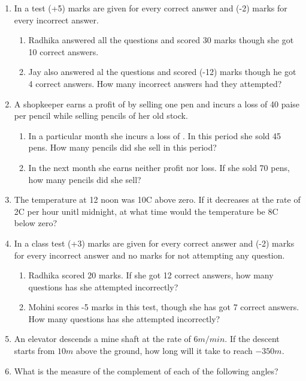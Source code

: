 \begin{enumerate}[label=\thesection.\arabic*, ref=\thesection.\theenumi,resume*]
	\item In a test (+5) marks are given for every correct answer and (-2) marks for every incorrect answer.  
		\begin{enumerate}
			\item Radhika answered all the questions and scored 30 marks though she got 10 correct answers.
			\item Jay also answered al the questions and scored (-12) marks though he got 4 correct answers.  How many incorrect answers had they  attempted?
		\end{enumerate}
	\item A shopkeeper earns a profit of  by selling one pen and incurs a loss of 40 paise per pencil while selling pencils of her old stock.  
		\begin{enumerate}
			\item In a particular month she incurs a loss of .  In this period she sold 45 pens.  How many pencils did she sell in this period?
			\item In the next month she earns neither profit nor loss.  If she sold 70 pens, how many pencils did she sell?
		\end{enumerate}
			\item The temperature at 12 noon was 10\degree C above zero. If it decreases at the rate of 2\degree C per hour unitl midnight, at what time would the temperature be 8\degree C below zero? 
	\item In a class test (+3) marks are given for every correct answer and (-2) marks for every incorrect answer and no marks for not attempting any question.   
		\begin{enumerate}
			\item Radhika scored 20 marks.  If she got 12 correct answers, how many questions has she attempted incorrectly?
			\item Mohini scores -5 marks in this test, though she has got 7 correct answers.   How many questions has she attempted incorrectly?
		\end{enumerate}
	\item An elevator descends a mine shaft at the rate of $6m/min$.  If the descent starts from $10m$ above the ground, how long will it take to reach $-350m$.
	\item What is the measure of the complement of each of the following angles? 
		\begin{enumerate}

\end{enumerate}
\end{enumerate}
